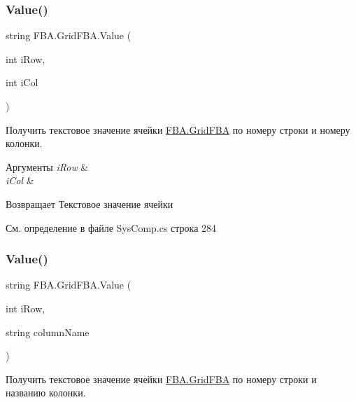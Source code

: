 \subsubsection{\texorpdfstring{Value()}{Value()}\hspace{0.1cm}{\footnotesize\ttfamily [1/4]}}
{\footnotesize\ttfamily string F\+B\+A.\+Grid\+F\+B\+A.\+Value (\begin{DoxyParamCaption}\item[{int}]{i\+Row,  }\item[{int}]{i\+Col }\end{DoxyParamCaption})}



Получить текстовое значение ячейки \mbox{\hyperlink{class_f_b_a_1_1_grid_f_b_a}{F\+B\+A.\+Grid\+F\+BA}} по номеру строки и номеру колонки. 


\begin{DoxyParams}{Аргументы}
{\em i\+Row} & \\
\hline
{\em i\+Col} & \\
\hline
\end{DoxyParams}
\begin{DoxyReturn}{Возвращает}
Текстовое значение ячейки
\end{DoxyReturn}


См. определение в файле Sys\+Comp.\+cs строка 284

\mbox{\label{class_f_b_a_1_1_grid_f_b_a_aa8d6a459be8af385dbbee050380f3375}} 
\subsubsection{\texorpdfstring{Value()}{Value()}\hspace{0.1cm}{\footnotesize\ttfamily [2/4]}}
{\footnotesize\ttfamily string F\+B\+A.\+Grid\+F\+B\+A.\+Value (\begin{DoxyParamCaption}\item[{int}]{i\+Row,  }\item[{string}]{column\+Name }\end{DoxyParamCaption})}



Получить текстовое значение ячейки \mbox{\hyperlink{class_f_b_a_1_1_grid_f_b_a}{F\+B\+A.\+Grid\+F\+BA}} по номеру строки и названию колонки. 


